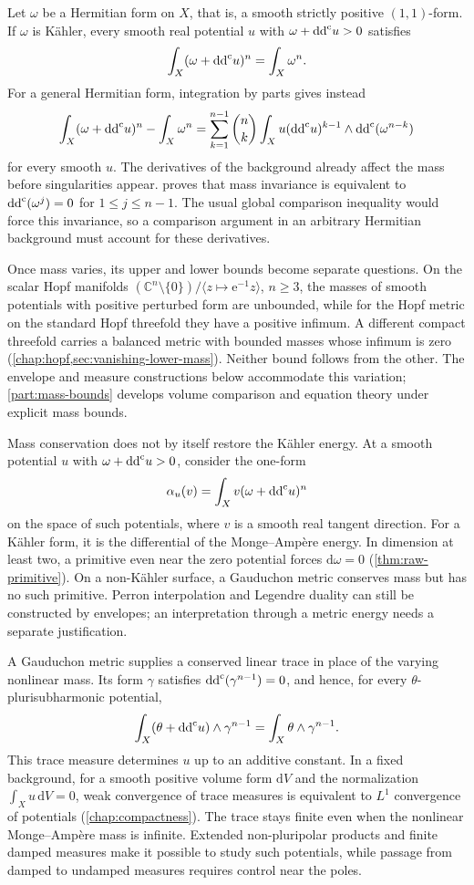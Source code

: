 Let $\omega$ be a Hermitian form on $X$, that is, a smooth strictly positive $(1,1)$-form. If $\omega$ is K\"ahler, every smooth real potential $u$ with $\omega+\mathrm{dd}^{\mathrm{c}} u>0$ satisfies
\[
 \int_X(\omega+\mathrm{dd}^{\mathrm{c}} u)^n=\int_X\omega^n.
\]
For a general Hermitian form, integration by parts gives instead
\[
 \int_X(\omega+\mathrm{dd}^{\mathrm{c}} u)^n-\int_X\omega^n
 =\sum_{k=1}^{n-1}\binom nk
   \int_X u(\mathrm{dd}^{\mathrm{c}} u)^{k-1}\wedge\mathrm{dd}^{\mathrm{c}}(\omega^{n-k})
\]
for every smooth $u$. The derivatives of the background already affect the mass before singularities appear.  proves that mass invariance is equivalent to $\mathrm{dd}^{\mathrm{c}}(\omega^j)=0$ for $1\leq j\leq n-1$. The usual global comparison inequality would force this invariance, so a comparison argument in an arbitrary Hermitian background must account for these derivatives.

Once mass varies, its upper and lower bounds become separate questions. On the scalar Hopf manifolds $(\mathbb C^n\setminus\{0\})/\langle z\mapsto\mathrm e^{-1}z\rangle$, $n\geq3$, the masses of smooth potentials with positive perturbed form are unbounded, while for the Hopf metric on the standard Hopf threefold they have a positive infimum. A different compact threefold carries a balanced metric with bounded masses whose infimum is zero (\cref{chap:hopf,sec:vanishing-lower-mass}). Neither bound follows from the other. The envelope and measure constructions below accommodate this variation; \cref{part:mass-bounds} develops volume comparison and equation theory under explicit mass bounds.

Mass conservation does not by itself restore the K\"ahler energy. At a smooth potential $u$ with $\omega+\mathrm{dd}^{\mathrm{c}} u>0$, consider the one-form
\[
 \alpha_u(v)=\int_X v(\omega+\mathrm{dd}^{\mathrm{c}} u)^n
\]
on the space of such potentials, where $v$ is a smooth real tangent direction. For a K\"ahler form, it is the differential of the Monge--Amp\`ere energy. In dimension at least two, a primitive even near the zero potential forces $\mathrm d\omega=0$ (\cref{thm:raw-primitive}). On a non-K\"ahler surface, a Gauduchon metric conserves mass but has no such primitive. Perron interpolation and Legendre duality can still be constructed by envelopes; an interpretation through a metric energy needs a separate justification.

A Gauduchon metric supplies a conserved linear trace in place of the varying nonlinear mass. Its form $\gamma$ satisfies $\mathrm{dd}^{\mathrm{c}}(\gamma^{n-1})=0$, and hence, for every $\theta$-plurisubharmonic potential,
\[
 \int_X(\theta+\mathrm{dd}^{\mathrm{c}} u)\wedge\gamma^{n-1}
 =\int_X\theta\wedge\gamma^{n-1}.
\]
This trace measure determines $u$ up to an additive constant. In a fixed background, for a smooth positive volume form $\mathrm dV$ and the normalization $\int_Xu\,\mathrm dV=0$, weak convergence of trace measures is equivalent to $L^1$ convergence of potentials (\cref{chap:compactness}). The trace stays finite even when the nonlinear Monge--Amp\`ere mass is infinite. Extended non-pluripolar products and finite damped measures make it possible to study such potentials, while passage from damped to undamped measures requires control near the poles.

